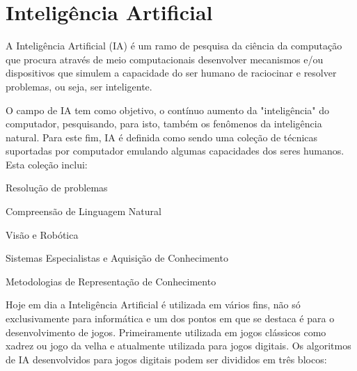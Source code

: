 \section{Inteligência Artificial}
\label{sec:inteligencia-artificial}

A Inteligência Artificial (IA) é um ramo de pesquisa da ciência da computação que procura através de meio computacionais desenvolver mecanismos e/ou dispositivos que simulem a capacidade do ser humano de raciocinar e resolver problemas, ou seja, ser inteligente. 

O campo de IA tem como objetivo, o contínuo aumento da "inteligência" do computador, pesquisando, para isto, também os fenômenos da inteligência natural. Para este fim, IA é definida  como sendo uma coleção de técnicas suportadas por computador emulando algumas capacidades dos seres humanos. Esta coleção inclui:

\begin{alineascomponto}
	
   \item Resolução de problemas
   \item Compreensão de Linguagem Natural
   \item Visão e Robótica
   \item Sistemas Especialistas e Aquisição de Conhecimento
   \item Metodologias de Representação de Conhecimento

	\end{alineascomponto}
	
	Hoje em dia a Inteligência Artificial é utilizada em vários fins, não só exclusivamente para informática e um dos pontos em que se destaca é para o desenvolvimento de jogos. Primeiramente utilizada em jogos clássicos como xadrez ou jogo da velha e atualmente utilizada para jogos digitais.
   Os algoritmos de IA desenvolvidos para jogos digitais podem ser divididos em três blocos:

